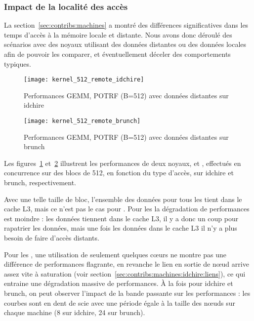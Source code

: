 \subsubsection{Impact de la localité des accès}

La section~\ref{sec:contribs:machines} a montré des différences significatives dans les temps d'accès à la mémoire locale et distante.
Nous avons donc déroulé des scénarios avec des noyaux utilisant des données distantes ou des données locales afin de pouvoir les comparer, et éventuellement déceler des comportements typiques.

\begin{figure}[t!]
  \centering
  \texttt{[image: kernel\_512\_remote\_idchire]}
  \caption{Performances GEMM, POTRF (B=512) avec données distantes sur idchire}\label{fig:contribs:apps:cholesky:perf-512-remote-idchire}
\end{figure}
\begin{figure}[h!]
  \centering
  \texttt{[image: kernel\_512\_remote\_brunch]}
  \caption{Performances GEMM, POTRF (B=512) avec données distantes sur brunch}\label{fig:contribs:apps:cholesky:perf-512-remote-brunch}
\end{figure}

Les figures~\ref{fig:contribs:apps:cholesky:perf-512-remote-idchire} et~\ref{fig:contribs:apps:cholesky:perf-512-remote-brunch} illustrent les performances de deux noyaux, \gemm et \potrf, effectués en concurrence sur des blocs de 512, en fonction du type d'accès, sur idchire et brunch, respectivement.

Avec une telle taille de bloc, l'ensemble des données pour tous les \potrf tient dans le cache L3, mais ce n'est pas le cas pour \gemm.
Pour les \potrf la dégradation de performances est moindre : les données tiennent dans le cache L3, il y a donc un coup pour rapatrier les données, mais une fois les données dans le cache L3 il n'y a plus besoin de faire d'accès distants.

Pour les \gemm, une utilisation de seulement quelques cœurs ne montre pas une différence de performances flagrante, en revanche le lien en sortie de nœud arrive assez vite à saturation (voir section~\ref{sec:contribs:machines:idchire:liens}), ce qui entraine une dégradation massive de performances.
À la fois pour idchire et brunch, on peut observer l'impact de la bande passante sur les performances : les courbes sont en dent de scie avec une période égale à la taille des nœuds sur chaque machine (8 sur idchire, 24 sur brunch).

